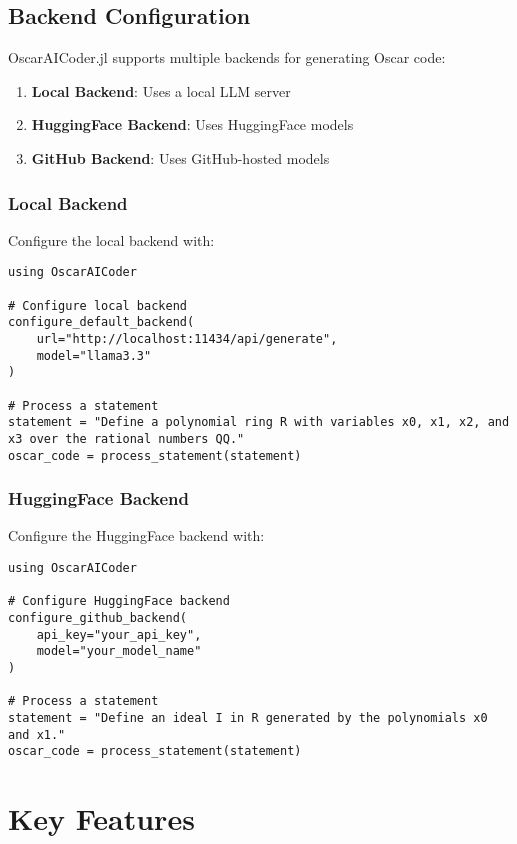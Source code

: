 \documentclass[11pt,a4paper]{article}
\begin{document}
\subsection{Backend Configuration}

OscarAICoder.jl supports multiple backends for generating Oscar code:

\begin{enumerate}
    \item \textbf{Local Backend}: Uses a local LLM server
    \item \textbf{HuggingFace Backend}: Uses HuggingFace models
    \item \textbf{GitHub Backend}: Uses GitHub-hosted models
\end{enumerate}

\subsubsection{Local Backend}

Configure the local backend with:

\begin{lstlisting}
using OscarAICoder

# Configure local backend
configure_default_backend(
    url="http://localhost:11434/api/generate",
    model="llama3.3"
)

# Process a statement
statement = "Define a polynomial ring R with variables x0, x1, x2, and x3 over the rational numbers QQ."
oscar_code = process_statement(statement)
\end{lstlisting}

\subsubsection{HuggingFace Backend}

Configure the HuggingFace backend with:

\begin{lstlisting}
using OscarAICoder

# Configure HuggingFace backend
configure_github_backend(
    api_key="your_api_key",
    model="your_model_name"
)

# Process a statement
statement = "Define an ideal I in R generated by the polynomials x0 and x1."
oscar_code = process_statement(statement)
\end{lstlisting}

\section{Key Features}
\end{document}
